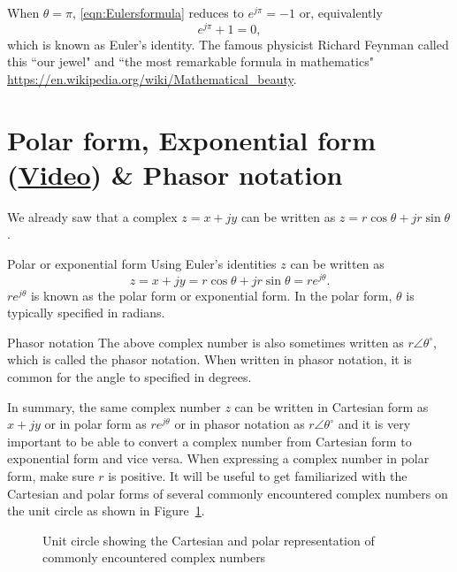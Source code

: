 When $\theta = \pi$, \eqref{eqn:Eulersformula} reduces to $e^{j \pi} = -1$ or, equivalently
\[
\boxed{e^{j \pi} + 1 = 0},
\]
which is known as Euler's identity. The famous physicist Richard Feynman called this
``our jewel" and ``the most remarkable formula in mathematics"
\url{https://en.wikipedia.org/wiki/Mathematical_beauty}.

\section{Polar form, Exponential form (\href{https://youtu.be/ypFkFwEQpL4}{Video}) \& Phasor notation}
We already saw that a complex $z = x+jy$ can be written as $z = r \cos \theta + j r \sin \theta$.
\begin{infobox}{Polar or exponential form}
Using Euler's identities $z$ can be written as
\begin{equation}
\label{eqn:polar2}
z = x +j y = r \cos \theta + j r \sin \theta = r e^{j \theta}.
\end{equation}
$r e^{j \theta}$ is known as the polar form or exponential form. In the polar form, $\theta$ is typically specified in radians.
\end{infobox}

\begin{infobox}{Phasor notation}
The above complex number is also sometimes written as $r \angle \theta^{\circ}$, which is called the phasor notation. When written in phasor notation, it is common for the angle to specified in degrees. 
\end{infobox}

In summary, the same complex number $z$ can be written in Cartesian form as $x+jy$ or in polar form as $re^{j \theta}$ or in phasor notation as $r \angle \theta^{\circ}$
and it is
very important to be able to convert a complex number from Cartesian form to exponential form and vice versa.
When expressing a complex number in polar form, make sure $r$ is positive.
It will be useful to get familiarized with the Cartesian and polar forms of several commonly encountered complex numbers on the unit circle as shown in Figure~\ref{fig:unitcircledetailed}.
\begin{figure}[h]
  \centering
  
  \caption{Unit circle showing the Cartesian and polar representation of commonly encountered complex numbers}
  \label{fig:unitcircledetailed}
\end{figure}

